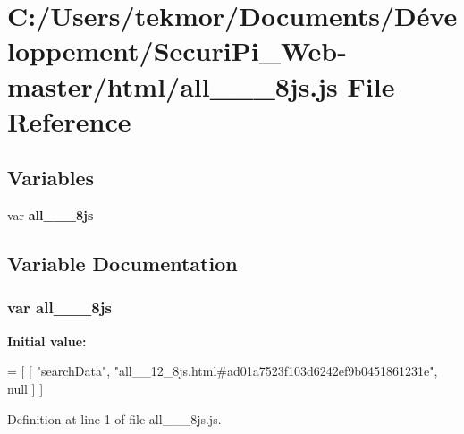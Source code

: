 \section{C\+:/\+Users/tekmor/\+Documents/\+Développement/\+Securi\+Pi\+\_\+\+Web-\/master/html/all\+\_\+\+\_\+\_\+8js.js File Reference}
\label{all____12__8js_8js}
\subsection*{Variables}
\begin{DoxyCompactItemize}
\item 
var {\bf all\+\_\+\+\_\+\_\+8js}
\end{DoxyCompactItemize}


\subsection{Variable Documentation}
\subsubsection[{all\+\_\+\+\_\+12\+\_\+8js}]{\setlength{\rightskip}{0pt plus 5cm}var all\+\_\+\+\_\+\_\+8js}\label{all____12__8js_8js_a333d67f1ce52db97b821f4677c7c480b}
{\bfseries Initial value\+:}
\begin{DoxyCode}
=
[
    [ \textcolor{stringliteral}{"searchData"}, \textcolor{stringliteral}{"all\_\_12\_8js.html#ad01a7523f103d6242ef9b0451861231e"}, null ]
]
\end{DoxyCode}


Definition at line 1 of file all\+\_\+\+\_\+\_\+8js.\+js.

